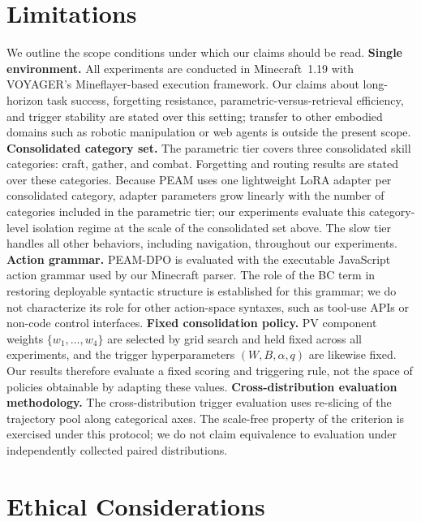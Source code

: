\documentclass[11pt]{article}
\begin{document}
\section*{Limitations}

We outline the scope conditions under which our claims should be read. \textbf{Single environment.} All experiments are conducted in Minecraft~1.19 with VOYAGER's Mineflayer-based execution framework. Our claims about long-horizon task success, forgetting resistance, parametric-versus-retrieval efficiency, and trigger stability are stated over this setting; transfer to other embodied domains such as robotic manipulation or web agents is outside the present scope. \textbf{Consolidated category set.} The parametric tier covers three consolidated skill categories: craft, gather, and combat. Forgetting and routing results are stated over these categories. Because PEAM uses one lightweight LoRA adapter per consolidated category, adapter parameters grow linearly with the number of categories included in the parametric tier; our experiments evaluate this category-level isolation regime at the scale of the consolidated set above. The slow tier handles all other behaviors, including navigation, throughout our experiments. \textbf{Action grammar.} PEAM-DPO is evaluated with the executable JavaScript action grammar used by our Minecraft parser. The role of the BC term in restoring deployable syntactic structure is established for this grammar; we do not characterize its role for other action-space syntaxes, such as tool-use APIs or non-code control interfaces. \textbf{Fixed consolidation policy.} PV component weights $\{w_1,\ldots,w_4\}$ are selected by grid search and held fixed across all experiments, and the trigger hyperparameters $(W,B,\alpha,q)$ are likewise fixed. Our results therefore evaluate a fixed scoring and triggering rule, not the space of policies obtainable by adapting these values. \textbf{Cross-distribution evaluation methodology.} The cross-distribution trigger evaluation uses re-slicing of the trajectory pool along categorical axes. The scale-free property of the criterion is exercised under this protocol; we do not claim equivalence to evaluation under independently collected paired distributions.

\section*{Ethical Considerations}
\end{document}
